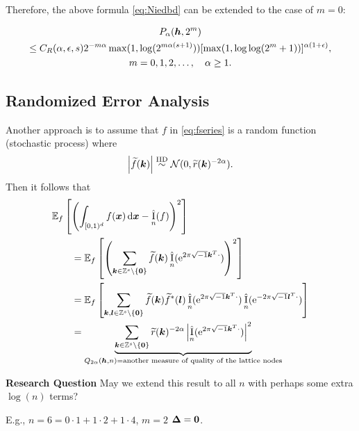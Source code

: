 \documentclass{amsart}
\newcommand{\tr}{\widetilde{r}}
\newcommand{\appxintn}{\appxint_n}
\DeclareMathOperator{\appxint}{\hat{I}}
\begin{document}
Therefore, the above formula \eqref{eq:Niedbd} can be extended to the case of $m=0$:

\begin{multline} \label{eq:Palphaextm}
    P_{\alpha}(\boldsymbol{h},2^m) \\
    \le C_{R}(\alpha,\epsilon,s)
    2^{-m\alpha}\max(1, \log(2^{m\alpha(s+1)})) [\max(1,\log \log (
    2^m+1))]^{\alpha(1+\epsilon)}, \\ m =0, 1, 2,\ldots, \quad \alpha \ge 1.
\end{multline}

\subsection{Randomized Error Analysis}
Another approach is to assume that $f$ in \eqref{eq:fseries} is a random function (stochastic process) where
\begin{equation}
    \abs{\tf(\vk)} \IIDsim \cn(0,\tr(\vk)^{-2\alpha}).
\end{equation}
Then it follows that
\begin{align*}
    \MoveEqLeft{\Ex_f\left[\left(\int_{[0,1)^d} f(\vx) \, \dif \vx - \appxintn(f) \right)^2\right]} \\
    & =
    \Ex_f\left[\left(\sum_{\vk \in \integers^s \setminus\{\vzero\}} \tf(\vk) \appxintn(\me^{2 \pi \sqrt{-1} \vk^T \cdot})\right)^2\right] \\
     & =
    \Ex_f\left[\sum_{\vk,\vl \in \integers^s \setminus\{\vzero\}} \tf(\vk) \tf^*(\vl) \appxintn(\me^{2 \pi \sqrt{-1} \vk^T \cdot}) \appxintn(\me^{-2 \pi \sqrt{-1} \vl^T \cdot})\right] \\
    & = \underbrace{\sum_{\vk\in \integers^s \setminus\{\vzero\}} \tr(\vk)^{-2\alpha} \abs{\appxintn(\me^{2 \pi \sqrt{-1} \vk^T \cdot})}^2}_{Q_{2\alpha}(\vh,n) = \text{another measure of quality of the lattice nodes}}  \\
\end{align*}

\textbf{Research Question}  May we extend this result to all $n$ with perhaps some extra $\log(n)$ terms?

E.g.,  $n =6 = 0\cdot 1 + 1 \cdot 2 + 1 \cdot 4$, $m = 2$ $\boldsymbol{\Delta} = \boldsymbol{0}$.
\end{document}
